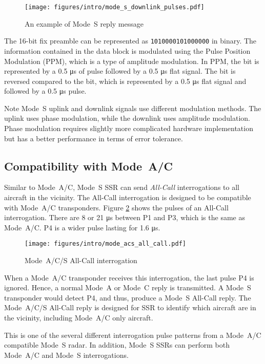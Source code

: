\begin{figure}[ht]
  \texttt{[image: figures/intro/mode\_s\_downlink\_pulses.pdf]}
  \caption{An example of Mode~S reply message}
  \label{fig:mode_s_downlink_pulses}
\end{figure}

The 16-bit fix preamble can be represented as \texttt{1010000101000000} in binary. The information contained in the data block is modulated using the Pulse Position Modulation (PPM), which is a type of amplitude modulation. In PPM, the \1 bit is represented by a 0.5 μs of pulse followed by a 0.5 μs flat signal. The \0 bit is reversed compared to the \1 bit, which is represented by a 0.5 μs flat signal and followed by a 0.5 μs pulse.

\begin{notebox}{Note}
  Mode~S uplink and downlink signals use different modulation methods. The uplink uses phase modulation, while the downlink uses amplitude modulation. Phase modulation requires slightly more complicated hardware implementation but has a better performance in terms of error tolerance. 
\end{notebox}

\subsection{Compatibility with Mode~A/C}

Similar to Mode~A/C, Mode~S SSR can send \emph{All-Call} interrogations to all aircraft in the vicinity. The All-Call interrogation is designed to be compatible with Mode~A/C transponders. Figure \ref{fig:mode_s_all_call} shows the pulses of an All-Call interrogation. There are 8 or 21 μs between P1 and P3, which is the same as Mode~A/C. P4 is a wider pulse lasting for 1.6 μs.

\begin{figure}[ht]
  \texttt{[image: figures/intro/mode\_acs\_all\_call.pdf]}
  \caption{Mode~A/C/S All-Call interrogation}
  \label{fig:mode_s_all_call}
\end{figure}

When a Mode~A/C transponder receives this interrogation, the last pulse P4 is ignored. Hence, a normal Mode~A or Mode~C reply is transmitted. A Mode~S transponder would detect P4, and thus, produce a Mode~S All-Call reply. The Mode~A/C/S All-Call reply is designed for SSR to identify which aircraft are in the vicinity, including Mode~A/C only aircraft.

This is one of the several different interrogation pulse patterns from a Mode~A/C compatible Mode~S radar. In addition, Mode~S SSRs can perform both Mode~A/C and Mode~S interrogations. 

